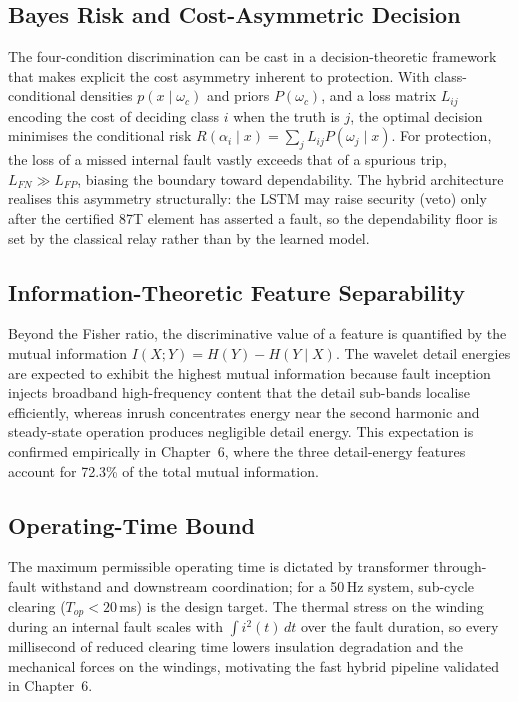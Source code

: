 \documentclass[12pt,a4paper,oneside]{report}
\begin{document}
\subsection{Bayes Risk and Cost-Asymmetric Decision}
The four-condition discrimination can be cast in a decision-theoretic framework that makes explicit the cost asymmetry inherent to protection. With class-conditional densities $p(x\mid\omega_c)$ and priors $P(\omega_c)$, and a loss matrix $L_{ij}$ encoding the cost of deciding class $i$ when the truth is $j$, the optimal decision minimises the conditional risk $R(\alpha_i\mid x)=\sum_j L_{ij}P(\omega_j\mid x)$. For protection, the loss of a missed internal fault vastly exceeds that of a spurious trip, $L_{FN}\gg L_{FP}$, biasing the boundary toward dependability. The hybrid architecture realises this asymmetry structurally: the LSTM may raise security (veto) only after the certified 87T element has asserted a fault, so the dependability floor is set by the classical relay rather than by the learned model.

\subsection{Information-Theoretic Feature Separability}
Beyond the Fisher ratio, the discriminative value of a feature is quantified by the mutual information $I(X;Y)=H(Y)-H(Y\mid X)$. The wavelet detail energies are expected to exhibit the highest mutual information because fault inception injects broadband high-frequency content that the detail sub-bands localise efficiently, whereas inrush concentrates energy near the second harmonic and steady-state operation produces negligible detail energy. This expectation is confirmed empirically in Chapter~6, where the three detail-energy features account for 72.3\% of the total mutual information.

\subsection{Operating-Time Bound}
The maximum permissible operating time is dictated by transformer through-fault withstand and downstream coordination; for a 50\,Hz system, sub-cycle clearing ($T_{op}<20$\,ms) is the design target. The thermal stress on the winding during an internal fault scales with $\int i^2(t)\,dt$ over the fault duration, so every millisecond of reduced clearing time lowers insulation degradation and the mechanical forces on the windings, motivating the fast hybrid pipeline validated in Chapter~6.
\end{document}
